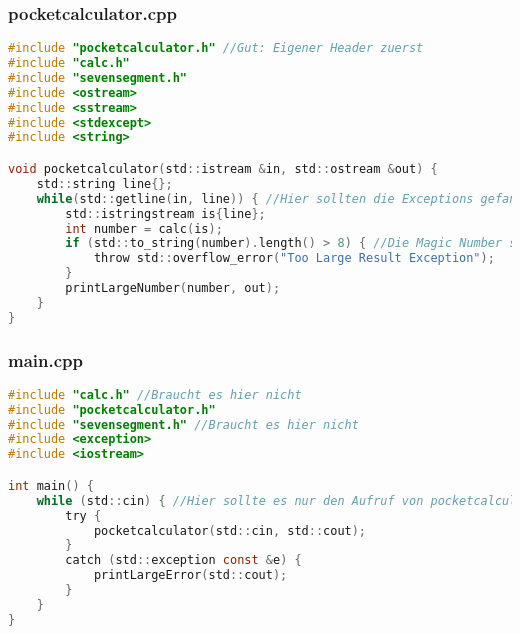 \subsubsection{pocketcalculator.cpp}
\begin{lstlisting}[style=frame, style= linenumbers, language=C]
#include "pocketcalculator.h" //Gut: Eigener Header zuerst
#include "calc.h"
#include "sevensegment.h"
#include <ostream>
#include <sstream>
#include <stdexcept>
#include <string>

void pocketcalculator(std::istream &in, std::ostream &out) {
	std::string line{};
	while(std::getline(in, line)) { //Hier sollten die Exceptions gefangen und Error ausgegeben werden
		std::istringstream is{line};
		int number = calc(is);
		if (std::to_string(number).length() > 8) { //Die Magic Number sollte in eine Konstante ausgelagert werden
			throw std::overflow_error("Too Large Result Exception");
		}
		printLargeNumber(number, out);
	}
}
\end{lstlisting}

\subsubsection{main.cpp}
\begin{lstlisting}[style=frame, style= linenumbers, language=C]
    #include "calc.h" //Braucht es hier nicht
#include "pocketcalculator.h"
#include "sevensegment.h" //Braucht es hier nicht
#include <exception>
#include <iostream>

int main() {
	while (std::cin) { //Hier sollte es nur den Aufruf von pocketcalculator() geben. Alles andere ist nicht testbar
		try {
			pocketcalculator(std::cin, std::cout);
		}
		catch (std::exception const &e) {
			printLargeError(std::cout);
		}
	}
}
\end{lstlisting}
